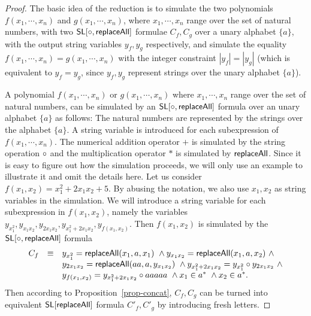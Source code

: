 \begin{proof}
	The basic idea of the reduction is to simulate the two polynomials $f(x_1,\cdots, x_n)$ and $g(x_1,\cdots, x_n)$, where $x_1,\cdots,x_n$ range over the set of natural numbers, with two $\mathsf{SL}[\circ,\mathsf{replaceAll}]$ formulae $C_f, C_g$ over a unary alphabet $\{a\}$, with the output string variables $y_f, y_g$ respectively, and simulate the equality $f(x_1,\cdots, x_n) = g(x_1,\cdots, x_n)$ with the integer constraint $|y_f|=|y_g|$ (which is equivalent to $y_f = y_g$, since $y_f, y_g$ represent strings over the unary alphabet $\{a\}$). 
	
	A polynomial $f(x_1,\cdots, x_n)$ or $g(x_1,\cdots, x_n)$ where $x_1, \cdots, x_n$ range over the set of natural numbers, can be simulated by an $\mathsf{SL}[\circ,\mathsf{replaceAll}]$ formula over an unary alphabet $\{a\}$ as follows: The natural numbers are represented by the strings over the alphabet $\{a\}$. A string variable is introduced for each subexpression of $f(x_1,\cdots, x_n)$. The numerical addition operator $+$ is simulated by the string operation $\circ$ 
	and the multiplication operator $*$ is simulated by $\mathsf{replaceAll}$. Since it is easy to figure out how the simulation proceeds, we will only use an example to illustrate it and omit the details here. Let us consider $f(x_1,x_2) = x_1^2 + 2 x_1 x_2 + 5$. By abusing the notation, we also use $x_1,x_2$ as string variables in the simulation. We will introduce a string variable for each subexpression in $f(x_1,x_2)$, namely the variables $y_{x_1^2}, y_{x_1x_2}, y_{2x_1x_2}, y_{x_1^2+2x_1x_2}, y_{f(x_1,x_2)}$. Then $f(x_1,x_2)$ is simulated by the $\mathsf{SL}[\circ,\mathsf{replaceAll}]$ formula
	\[
	\begin{array} {l c l }
	C_f & \equiv & y_{x_1^2} = \replaceall(x_1,a, x_1)\ \wedge y_{x_1x_2} = \replaceall(x_1, a, x_2)\ \wedge \\
	& & y_{2x_1x_2} = \replaceall(aa, a, y_{x_1x_2})\ \wedge y_{x_1^2+2x_1x_2} = y_{x_1^2} \concat y_{2x_1x_2}\ \wedge  \\
	& & y_{f(x_1,x_2)}=y_{x_1^2+2x_1x_2} \concat a a a a a\ \wedge x_1 \in a^*\ \wedge x_2 \in a^*.
	\end{array}
	\]
	Then according to Proposition~\ref{prop-concat}, $C_f, C_g$ can be turned into equivalent $\mathsf{SL}[\mathsf{replaceAll}]$ formula $C'_f, C'_g$ by introducing fresh letters.
	

\end{proof}
